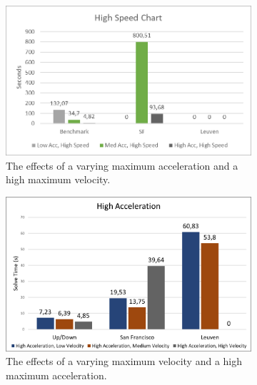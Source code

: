 \begin{figure}
	\centering
	
	\begin{subfigure}[t]{\textwidth}
        		\includegraphics[width=\textwidth]{img/agility-high-speed}
        		\caption{The effects of a varying maximum acceleration and a high maximum velocity.}
        		\label{fig:agility-high-speed}
	\end{subfigure}
	\par\bigskip	
	\begin{subfigure}[t]{\textwidth}
        		\includegraphics[width=\textwidth]{img/agility-high-acc}
        		\caption{The effects of a varying maximum velocity and a high maximum acceleration.}
        		\label{fig:agility-high-acc}
	\end{subfigure}	
	
        
    \caption[The high velocity and high acceleration results]{}\label{fig:agility-high}
\end{figure}



